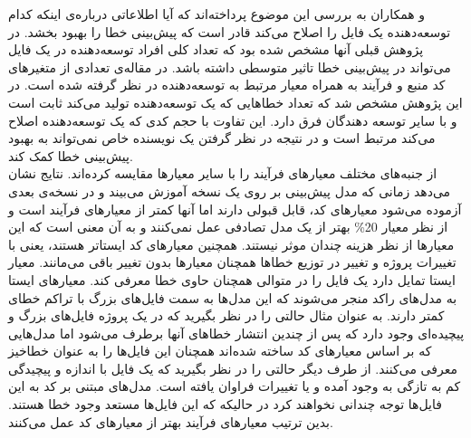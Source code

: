  و همکاران به بررسی این موضوع پرداخته‌اند که آیا اطلاعاتی درباره‌ی اینکه کدام توسعه‌دهنده یک فایل را اصلاح می‌کند قادر است که پیش‌بینی خطا را بهبود بخشد. در پژوهش قبلی آنها\cite{weyuker2008too} مشخص شده بود که تعداد کلی   افراد توسعه‌دهنده در یک فایل می‌تواند در پیش‌بینی خطا تاثیر متوسطی داشته باشد. در  مقاله‌ی \cite{ostrand2010programmer}  تعدادی از متغیرهای کد منبع و فرآیند به همراه معیار مرتبط به توسعه‌دهنده در نظر گرفته شده است.  در این پژوهش مشخص شد  که تعداد خطاهایی که یک توسعه‌دهنده تولید می‌کند ثابت است و با سایر توسعه دهندگان فرق دارد. این تفاوت با  حجم کدی که یک توسعه‌دهنده اصلاح می‌کند مرتبط است و در نتیجه در نظر گرفتن یک نویسنده خاص نمی‌تواند به بهبود پیش‌بینی خطا کمک کند\cite{ostrand2010programmer}. \\

 از جنبه‌های مختلف معیارهای فرآیند  را با سایر معیارها مقایسه کرده‌اند\cite{rahman2013and}. نتایج نشان می‌دهد  زمانی که مدل پیش‌بینی بر روی یک نسخه آموزش می‌بیند و در نسخه‌ی بعدی آزموده می‌شود معیارهای کد،  قابل قبولی دارند اما    آنها کمتر از معیارهای فرآیند است  و از نظر معیار 20\% 
بهتر از یک مدل تصادفی عمل نمی‌کنند و  به آن معنی است که این معیارها از نظر هزینه چندان  موثر نیستند. همچنین معیارهای کد ایستاتر هستند، ‌یعنی با تغییرات پروژه و تغییر در توزیع خطاها همچنان معیارها بدون تغییر باقی می‌مانند. معیار ایستا تمایل دارد یک فایل را در  متوالی همچنان حاوی خطا معرفی کند. معیارهای ایستا به مدل‌های راکد منجر می‌شوند که این مدل‌ها به سمت فایل‌های بزرگ با تراکم خطای کمتر  دارند. به عنوان مثال حالتی را در نظر بگیرید که در یک پروژه فایل‌های بزرگ و پیچیده‌ای وجود دارد که پس از چندین انتشار خطاهای آنها برطرف می‌شود اما مدل‌هایی که بر اساس معیارهای کد ساخته شده‌اند همچنان این فایل‌ها را به عنوان خطا‌خیز معرفی می‌کنند. از طرف دیگر حالتی را در نظر بگیرید که یک فایل با اندازه و پیچیدگی کم به تازگی به وجود آمده و یا تغییرات فراوان یافته است. مدل‌های مبتنی بر کد به این فایل‌ها توجه چندانی نخواهند کرد در حالیکه که این فایل‌ها مستعد وجود خطا هستند. بدین ترتیب معیارهای فرآیند بهتر از معیارهای کد عمل می‌کنند. 
 
 
